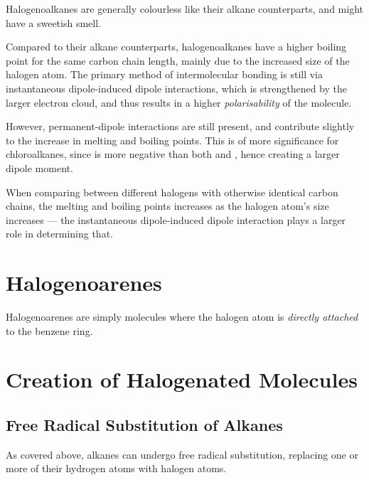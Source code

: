 			Halogenoalkanes are generally colourless like their alkane counterparts, and might have a sweetish smell.

			Compared to their alkane counterparts, halogenoalkanes have a higher boiling point for the same carbon chain length,
			mainly due to the increased size of the halogen atom. The primary method of intermolecular bonding is still via
			instantaneous dipole-induced dipole interactions, which is strengthened by the larger electron cloud, and thus results in
			a higher \textit{polarisability} of the molecule.

			However, permanent-dipole interactions are still present, and contribute slightly to the increase in melting and boiling points.
			This is of more significance for chloroalkanes, since \ch{\chlorine} is more negative than both  and , hence creating
			a larger dipole moment.

			When comparing between different halogens with otherwise identical carbon chains, the melting and boiling points increases as
			the halogen atom's size increases –– the instantaneous dipole-induced dipole interaction plays a larger role in determining
			that.



	\pagebreak
	\section{Halogenoarenes}

		Halogenoarenes are simply molecules where the halogen atom is \textit{directly attached} to the benzene ring.





	\section{Creation of Halogenated Molecules}

		\subsection{Free Radical Substitution of Alkanes}

			As covered above, alkanes can undergo free radical substitution, replacing one or more of their hydrogen atoms with halogen
			atoms.

